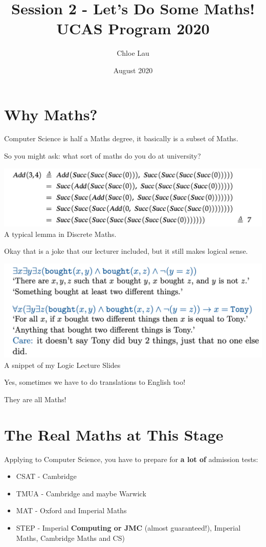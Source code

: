 \documentclass[12pt]{article}
\title{\vspace{-2cm} \textbf{Session 2 - Let's Do Some Maths!} \\ UCAS Program 2020}
\author{Chloe Lau}
\date{August 2020}
\begin{document}
\setlength{\parindent}{4ex}
\setlength{\parskip}{1em}

\maketitle

\section{Why Maths?}
Computer Science is half a Maths degree, it basically is a subset of Maths.

So you might ask: what sort of maths do you do at university?

\begin{center}
    \includegraphics[scale=0.55]{add.png}
    A typical lemma in Discrete Maths.
\end{center}

Okay that is a joke that our lecturer included, but it still makes logical sense.

\begin{center}
    \includegraphics[scale=0.4]{logic.png}
    A snippet of my Logic Lecture Slides
\end{center}

Yes, sometimes we have to do translations to English too!

They are all Maths!

\section{The Real Maths at This Stage}
Applying to Computer Science, you have to prepare for \textbf{a lot of} admission tests:
\begin{itemize}
    \item CSAT - Cambridge
    \item TMUA - Cambridge and maybe Warwick
    \item MAT - Oxford and Imperial Maths
    \item STEP - Imperial \textbf{Computing or JMC} (almost guaranteed!), Imperial Maths, Cambridge Maths and CS)
\end{itemize}
\end{document}
